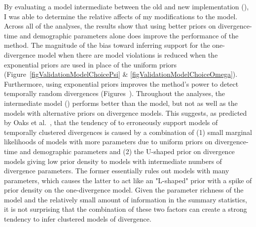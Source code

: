 By evaluating a model intermediate between the old and new implementation
(\modelUshaped), I was able to determine the relative affects of my 
modifications to the model.
Across all of the analyses, the results show that using better priors on
divergence-time and demographic parameters alone does improve the performance
of the method.
The magnitude of the bias toward inferring support for the one-divergence
model when there are model violations is reduced when the exponential
priors are used in place of the uniform priors
(Figure~\ref{figValidationModelChoicePsi} \&
\ref{figValidationModelChoiceOmega}).
Furthermore, using exponential priors improves the method's power to detect
temporally random divergences
(Figures~).
Throughout the analyses, the intermediate model (\modelUshaped) performs better
than the \msb model, but not as well as the models with alternative priors on
divergence models.
This suggests, as predicted by Oaks et al.\ \cite{Oaks2012,Oaks2014reply}, that
the tendency of \msb to erroneously support models of temporally clustered
divergences is caused by a combination of
(1) small marginal likelihoods of models with more \divTime{} parameters due to
uniform priors on divergence-time and demographic parameters and
(2) the U-shaped prior on divergence models giving low prior density to models
with intermediate numbers of divergence parameters.
The former essentially rules out models with many \divTime{} parameters, which
causes the latter to act like an "L-shaped" prior with a spike of
prior density on the one-divergence model.
Given the parameter richness of the model and the relatively small amount of
information in the summary statistics, it is not surprising that the
combination of these two factors can create a strong tendency to infer
clustered models of divergence.

